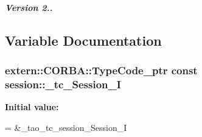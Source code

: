 \subparagraph*{Version 2.. }

\subsection{Variable Documentation}
\subsubsection[{\+\_\+tc\+\_\+\+Session\+\_\+I}]{\setlength{\rightskip}{0pt plus 5cm}extern\+::\+C\+O\+R\+B\+A\+::\+Type\+Code\+\_\+ptr const session\+::\+\_\+tc\+\_\+\+Session\+\_\+I}\label{namespacesession_a0e902286229e30868361b2649792014e}
{\bfseries Initial value\+:}
\begin{DoxyCode}
=
    &\_tao\_tc\_session\_Session\_I
\end{DoxyCode}
